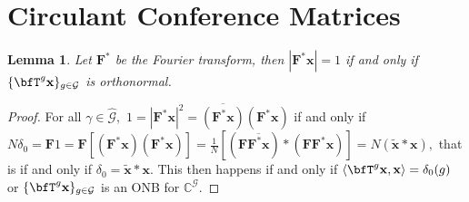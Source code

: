 \documentclass[3p,11pt]{elsarticle}
\newcommand{\bbC}{\mathbb{C}}
\newcommand{\bfF}{\mathbf{F}}
\newcommand{\bfx}{\mathbf{x}}
\newcommand{\calG}{\mathcal{G}}
\newcommand{\abs}[1]{|{#1}|}
\newcommand{\ip}[2]{\langle{#1},{#2}\rangle}
\newtheorem{lemma}[theorem]{Lemma}
\theoremstyle{definition}
\begin{document}
\section{Circulant Conference Matrices}
\begin{lemma}
\label{lemma:Fourier Transform is Constant modulus}
Let $\bfF^*$ be the Fourier transform, then $\abs{\bfF^*\bfx}=1$ if and only if $\{\bfT^g\bfx\}_{g\in\calG}$ is orthonormal.
\end{lemma}
\begin{proof}
For all $\gamma\in\hat{\calG},$ $1=\abs{\bfF^*\bfx}^2=\overline{(\bfF^*\bfx)}(\bfF^*\bfx)$ if and only if $N\delta_0=\bfF1=\bfF\left[(\bfF^*\bfx)(\bfF^*\bfx)\right]=\frac{1}{N}\left[(\bfF\overline{\bfF^*\bfx})*(\bfF\bfF^*\bfx)\right]=N(\tilde{\bfx}*\bfx),$ that is if and only if $\delta_0=\tilde{\bfx}*\bfx.$ This then happens if and only if $\ip{\bfT^g\bfx}{\bfx}=\delta_0(g)$ or $\{\bfT^g\bfx\}_{g\in\calG}$ is an ONB for $\bbC^\calG.$
\end{proof}
\end{document}
